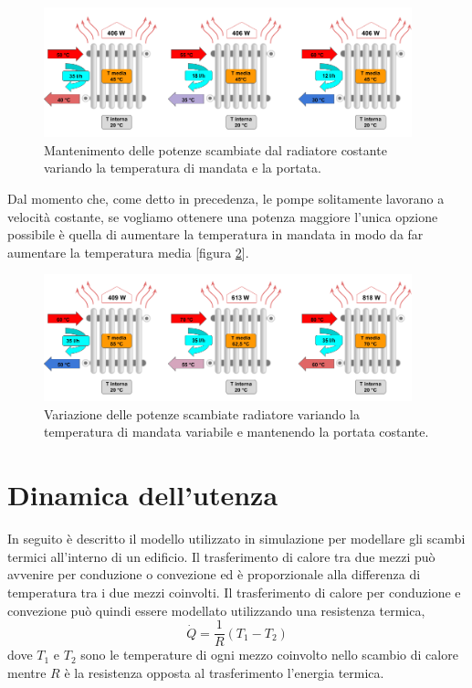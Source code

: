 \documentclass[laurea,oneside,11pt]{USiena_tesiLM}
\begin{document}
\begin{figure}[h]
\begin{center}
\includegraphics[width=0.95\textwidth]{figure/portata} %
\caption{Mantenimento delle potenze scambiate dal radiatore costante variando la temperatura di mandata e la portata.}
\label{fig:portata}
\end{center}
\end{figure}

Dal momento che, come detto in precedenza, le pompe solitamente lavorano a velocità costante, se vogliamo ottenere una potenza maggiore l'unica opzione possibile è quella di aumentare la temperatura in mandata in modo da far aumentare la temperatura media [figura \ref{fig:portata2}].

\begin{figure}[h]
\begin{center}
\includegraphics[width=0.95\textwidth]{figure/portata2} %
\caption{Variazione delle potenze scambiate radiatore variando la temperatura di mandata variabile e mantenendo la portata costante.}
\label{fig:portata2}
\end{center}
\end{figure}

\section{Dinamica dell'utenza}
\label{sec:dinamicautenza}
In seguito è descritto il modello utilizzato in simulazione per modellare gli scambi termici all'interno di un edificio. 
Il trasferimento di calore tra due mezzi può avvenire per conduzione o convezione ed è proporzionale alla differenza di temperatura tra i due mezzi coinvolti. Il trasferimento di calore per conduzione e convezione può quindi essere modellato utilizzando una resistenza termica,
\begin{equation}
\dot{Q} = \frac{1}{R} (T_1-T_2)
\label{eq:q1}
\end{equation}
dove $T_1$ e $T_2$ sono le temperature di ogni mezzo coinvolto nello scambio di calore mentre $R$ è la resistenza opposta al trasferimento l'energia termica.
\end{document}
